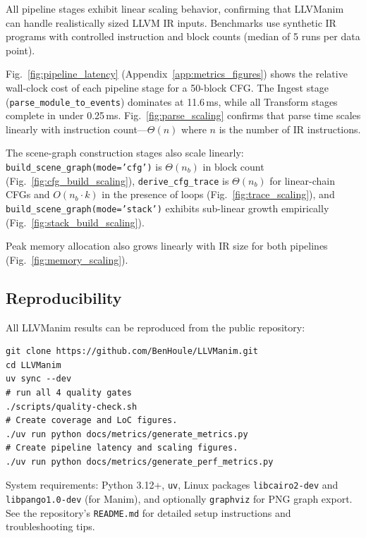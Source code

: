 All pipeline stages exhibit linear scaling behavior, confirming that LLVManim can handle realistically sized LLVM IR inputs. Benchmarks use synthetic IR programs with controlled instruction and block counts (median of 5 runs per data point).

Fig.~\ref{fig:pipeline_latency} (Appendix~\ref{app:metrics_figures}) shows the relative wall-clock cost of each pipeline stage for a 50-block CFG. The Ingest stage (\texttt{parse\_module\_to\_events}) dominates at 11.6\,ms, while all Transform stages complete in under 0.25\,ms. Fig.~\ref{fig:parse_scaling} confirms that parse time scales linearly with instruction count---$\Theta(n)$ where $n$ is the number of IR instructions.

The scene-graph construction stages also scale linearly: \texttt{build\_scene\_graph(mode='cfg')} is $\Theta(n_b)$ in block count (Fig.~\ref{fig:cfg_build_scaling}), \texttt{derive\_cfg\_trace} is $\Theta(n_b)$ for linear-chain CFGs and $O(n_b \cdot k)$ in the presence of loops (Fig.~\ref{fig:trace_scaling}), and \texttt{build\_scene\_graph(mode='stack')} exhibits sub-linear growth empirically (Fig.~\ref{fig:stack_build_scaling}).

Peak memory allocation also grows linearly with IR size for both pipelines (Fig.~\ref{fig:memory_scaling}).

\subsection{Reproducibility}
All LLVManim results can be reproduced from the public repository\cite{llvmanim-repo}:

\begin{verbatim}
git clone https://github.com/BenHoule/LLVManim.git
cd LLVManim
uv sync --dev
# run all 4 quality gates
./scripts/quality-check.sh
# Create coverage and LoC figures.
./uv run python docs/metrics/generate_metrics.py
# Create pipeline latency and scaling figures.
./uv run python docs/metrics/generate_perf_metrics.py
\end{verbatim}

System requirements: Python 3.12+, \texttt{uv}, Linux packages \texttt{libcairo2-dev} and \texttt{libpango1.0-dev} (for Manim), and optionally \texttt{graphviz} for PNG graph export. See the repository's \texttt{README.md} for detailed setup instructions and troubleshooting tips.
